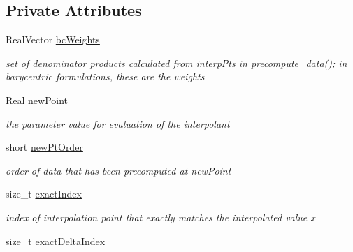 \subsection*{Private Attributes}
\begin{DoxyCompactItemize}
\item 
Real\+Vector \hyperlink{classPecos_1_1LagrangeInterpPolynomial_ad03ebcd5b1f04eafbe1a63a0f0531323}{bc\+Weights}\label{classPecos_1_1LagrangeInterpPolynomial_ad03ebcd5b1f04eafbe1a63a0f0531323}

\begin{DoxyCompactList}\small\item\em set of denominator products calculated from interp\+Pts in \hyperlink{classPecos_1_1LagrangeInterpPolynomial_a9a5fd3dc945d15c8423dc66dcd137b4f}{precompute\+\_\+data()}; in barycentric formulations, these are the weights \end{DoxyCompactList}\item 
Real \hyperlink{classPecos_1_1LagrangeInterpPolynomial_a313026836e25a5343e39c3d85028ad65}{new\+Point}\label{classPecos_1_1LagrangeInterpPolynomial_a313026836e25a5343e39c3d85028ad65}

\begin{DoxyCompactList}\small\item\em the parameter value for evaluation of the interpolant \end{DoxyCompactList}\item 
short \hyperlink{classPecos_1_1LagrangeInterpPolynomial_a26ebb456478d76c18ce529af2999ada3}{new\+Pt\+Order}\label{classPecos_1_1LagrangeInterpPolynomial_a26ebb456478d76c18ce529af2999ada3}

\begin{DoxyCompactList}\small\item\em order of data that has been precomputed at new\+Point \end{DoxyCompactList}\item 
size\+\_\+t \hyperlink{classPecos_1_1LagrangeInterpPolynomial_a9420cf614b90798b9423727ff03d4731}{exact\+Index}\label{classPecos_1_1LagrangeInterpPolynomial_a9420cf614b90798b9423727ff03d4731}

\begin{DoxyCompactList}\small\item\em index of interpolation point that exactly matches the interpolated value x \end{DoxyCompactList}\item 
size\+\_\+t \hyperlink{classPecos_1_1LagrangeInterpPolynomial_a041eca6801cc6ba2230113995a3d5ac0}{exact\+Delta\+Index}\label{classPecos_1_1LagrangeInterpPolynomial_a041eca6801cc6ba2230113995a3d5ac0}


\end{DoxyCompactItemize}
